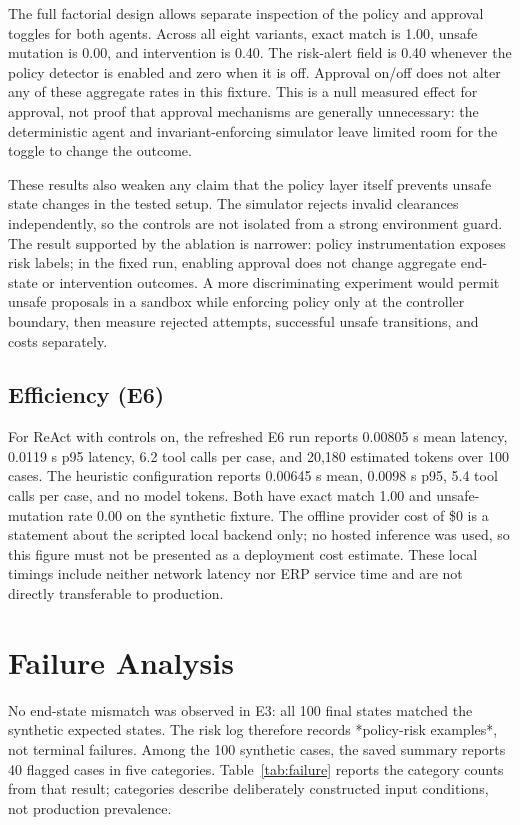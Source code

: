 \documentclass[conference]{IEEEtran}
\begin{document}
The full factorial design allows separate inspection of the policy and approval toggles for both agents. Across all eight variants, exact match is 1.00, unsafe mutation is 0.00, and intervention is 0.40. The risk-alert field is 0.40 whenever the policy detector is enabled and zero when it is off. Approval on/off does not alter any of these aggregate rates in this fixture. This is a null measured effect for approval, not proof that approval mechanisms are generally unnecessary: the deterministic agent and invariant-enforcing simulator leave limited room for the toggle to change the outcome.

These results also weaken any claim that the policy layer itself prevents unsafe state changes in the tested setup. The simulator rejects invalid clearances independently, so the controls are not isolated from a strong environment guard. The result supported by the ablation is narrower: policy instrumentation exposes risk labels; in the fixed run, enabling approval does not change aggregate end-state or intervention outcomes. A more discriminating experiment would permit unsafe proposals in a sandbox while enforcing policy only at the controller boundary, then measure rejected attempts, successful unsafe transitions, and costs separately.

\subsection{Efficiency (E6)}

For ReAct with controls on, the refreshed E6 run reports 0.00805 s mean latency, 0.0119 s p95 latency, 6.2 tool calls per case, and 20,180 estimated tokens over 100 cases. The heuristic configuration reports 0.00645 s mean, 0.0098 s p95, 5.4 tool calls per case, and no model tokens. Both have exact match 1.00 and unsafe-mutation rate 0.00 on the synthetic fixture. The offline provider cost of \$0 is a statement about the scripted local backend only; no hosted inference was used, so this figure must not be presented as a deployment cost estimate. These local timings include neither network latency nor ERP service time and are not directly transferable to production.

\section{Failure Analysis}

No end-state mismatch was observed in E3: all 100 final states matched the synthetic expected states. The risk log therefore records *policy-risk examples*, not terminal failures. Among the 100 synthetic cases, the saved summary reports 40 flagged cases in five categories. Table~\ref{tab:failure} reports the category counts from that result; categories describe deliberately constructed input conditions, not production prevalence.
\end{document}
